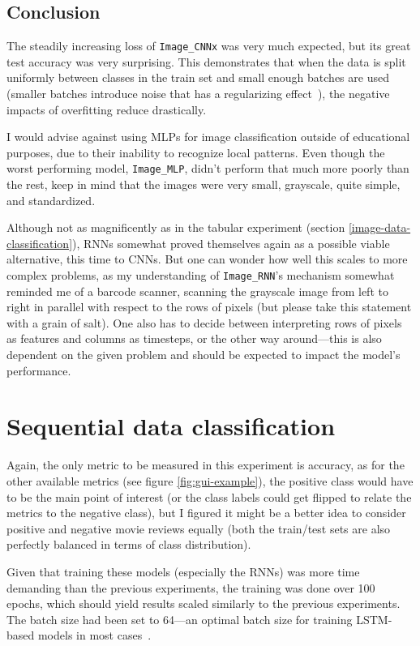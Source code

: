 \subsection{Conclusion}
The steadily increasing loss of \texttt{Image\_CNNx} was very much expected, but its great test accuracy
was very surprising. This demonstrates that when the data is split uniformly between classes in the train
set and small enough batches are used (smaller batches introduce noise that has a regularizing
effect~\cite{DBLP:journals/corr/abs-1804-07612}),
the negative impacts of overfitting reduce drastically.

I would advise against using MLPs for image classification outside of educational purposes, 
due to their inability to recognize local patterns. Even though the worst performing model,
\texttt{Image\_MLP}, didn't perform that much more poorly than the rest,
keep in mind that the images were very small, grayscale, quite simple, and standardized.

Although not as magnificently as in the tabular experiment (section \ref{image-data-classification}),
RNNs somewhat proved themselves again as a possible viable alternative, this time to CNNs.
But one can wonder how well this scales to more complex problems, as my understanding of \texttt{Image\_RNN}'s
mechanism somewhat reminded me of a barcode scanner, scanning the grayscale image from left to right
in parallel with respect to the rows of pixels (but please take this statement with a grain of salt).
One also has to decide between interpreting rows of pixels as features and columns as timesteps, or the other way
around---this is also dependent on the given problem and should be expected to impact the model's performance.




\section{Sequential data classification}
\label{sequential-data-classification}
Again, the only metric to be measured in this experiment is accuracy, as for the other available metrics (see figure
\ref{fig:gui-example}),
the positive class would have to be the main point of interest (or the class labels could get flipped
to relate the metrics to the negative class), but I figured
it might be a better idea to consider positive and negative movie reviews equally (both the train/test sets
are also perfectly balanced in terms of class distribution).

Given that training these models (especially the RNNs) was more time demanding than the previous experiments,
the training was done over 100 epochs, which should yield results scaled similarly to the previous experiments.
The batch size had been set to 64---an optimal batch size for training LSTM-based models in most cases~\cite{gures_2020}.


